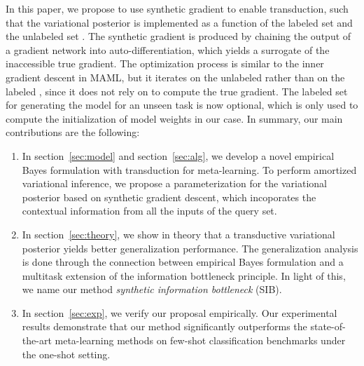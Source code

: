 \documentclass{article} \usepackage{iclr2020_conference,times}
\begin{document}
In this paper, we propose to use synthetic gradient \citep{jaderberg2017decoupled} 
to enable transduction, such that the variational posterior is implemented as a function of the labeled set  and the unlabeled set .
The synthetic gradient is produced by chaining the output of a gradient network into auto-differentiation, 
which yields a surrogate of the inaccessible true gradient.
The optimization process is similar to the inner gradient descent in MAML, but it iterates on the unlabeled  rather than on the labeled ,
since it does not rely on  to compute the true gradient.
The labeled set for generating the model for an unseen task is now optional, which is only used to compute the initialization of model weights in our case. In summary, our main contributions are the following:   
\begin{enumerate}
    \item In section~\ref{sec:model} and section~\ref{sec:alg}, 
        we develop a novel empirical Bayes formulation with transduction for meta-learning.
        To perform amortized variational inference, we propose a parameterization for the variational posterior 
        based on synthetic gradient descent, which incoporates the contextual information from all the inputs of the query set.
    \item In section~\ref{sec:theory}, we show in theory that a transductive variational posterior yields better generalization performance.
        The generalization analysis is done through the connection between empirical Bayes formulation and
        a multitask extension of the information bottleneck principle.
        In light of this, we name our method \emph{synthetic information bottleneck} (SIB).
    \item In section~\ref{sec:exp}, we verify our proposal empirically. 
        Our experimental results demonstrate that our method significantly outperforms the state-of-the-art meta-learning methods 
        on few-shot classification benchmarks under the one-shot setting. 
\end{enumerate}
\end{document}
